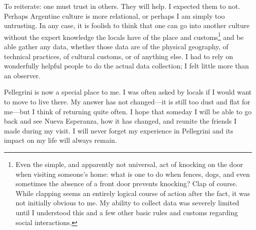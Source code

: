 To reiterate: one must trust in others. They will help. I expected them to not. Perhaps Argentine culture is more relational, or perhaps I am simply too untrusting. In any case, it is foolish to think that one can go into another culture without the expert knowledge the locals have of the place and customs\footnote{Even the simple, and apparently not universal, act of knocking on the door when visiting someone's home: what is one to do when fences, dogs, and even sometimes the absence of a front door prevents knocking? Clap of course. While clapping seems an entirely logical course of action after the fact, it was not initially obvious to me. My ability to collect data was severely limited until I understood this and a few other basic rules and customs regarding social interactions.} and be able gather any data, whether those data are of the physical geography, of technical practices, of cultural customs, or of anything else. I had to rely on wonderfully helpful people to do the actual data collection; I felt little more than an observer.

Pellegrini is now a special place to me. I was often asked by locals if I would want to move to live there. My answer has not changed---it is still too dust and flat for me---but I think of returning quite often. I hope that someday I will be able to go back and see Nueva Esperanza, how it has changed, and reunite the friends I made during my visit. I will never forget my experience in Pellegrini and its impact on my life will always remain.